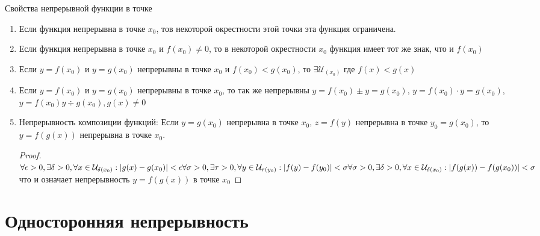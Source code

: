 \documentclass[oneside]{book}
\begin{document}
\begin{enumerate}
Свойства непрерывной функции в точке
\begin{enumerate}
    \item Если функция непрерывна в точке $x_0$, тов некоторой окрестности этой точки эта функция ограничена.
    \item Если функция непрерывна в точке $x_0$ и $f(x_0) \neq 0$, то в некоторой окрестности $x_0$ функция имеет тот же знак, что и $f(x_0)$
    \item Если $y = f(x_0)$ и $y = g(x_0)$ непрерывны в точке $x_0$ и $f(x_0) < g(x_0)$, то $\exists \mathcal{U}_{(x_0)}$ где $f(x) < g(x)$
    \item Если $y = f(x_0)$ и $y = g(x_0)$ непрерывны в точке $x_0$, то так же непрерывны $y = f(x_0) \pm y = g(x_0)$, $y = f(x_0) \cdot y = g(x_0)$, $y = f(x_0) y \div g(x_0), g(x) \neq 0$
    \item Непрерывность композиции функций: Если $y = g(x_0)$ непрерывна в точке $x_0$, $z = f(y)$ непрерывна в точке $y_0 = g(x_0)$, то
          $y = f(g(x))$ непрерывна в точке $x_0$.
          \begin{proof}
            $ \\
            \forall \epsilon > 0, \exists \delta > 0, \forall x \in \mathcal{U}_{\delta(x_0)}: |g(x) - g(x_0)|<\epsilon \\
            \forall \sigma > 0, \exists \tau > 0, \forall y \in \mathcal{U}_{\tau(y_0)}: |f(y) - f(y_0)|<\sigma \\
            \forall \sigma > 0, \exists \delta > 0, \forall x \in \mathcal{U}_{\delta(x_0)}: |f(g(x)) - f(g(x_0))|<\sigma \\
            $
            что и означает непрерывность $y = f(g(x))$ в точке $x_0$
        \end{proof}
\end{enumerate}

\section[Односторонняя]{Односторонняя непрерывность}


\end{enumerate}
\end{document}
